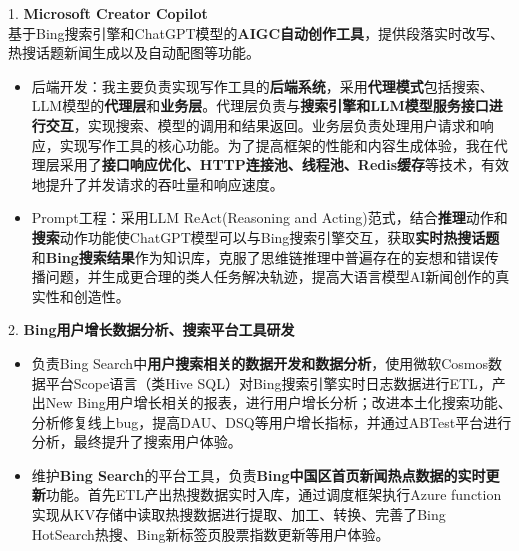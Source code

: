 \documentclass{resume}
\begin{document}

  1. \textbf{Microsoft Creator Copilot} 
  \\
  基于Bing搜索引擎和ChatGPT模型的\textbf{AIGC自动创作工具}，提供段落实时改写、热搜话题新闻生成以及自动配图等功能。
  \begin{spacing}{1.2} 
  \begin{itemize}
    \item 后端开发：我主要负责实现写作工具的\textbf{后端系统}，采用\textbf{代理模式}包括搜索、LLM模型的\textbf{代理层}和\textbf{业务层}。代理层负责与\textbf{搜索引擎和LLM模型服务接口进行交互}，实现搜索、模型的调用和结果返回。业务层负责处理用户请求和响应，实现写作工具的核心功能。为了提高框架的性能和内容生成体验，我在代理层采用了\textbf{接口响应优化、HTTP连接池、线程池、Redis缓存}等技术，有效地提升了并发请求的吞吐量和响应速度。
    \item Prompt工程：采用LLM ReAct(Reasoning and Acting)范式，结合\textbf{推理}动作和\textbf{搜索}动作功能使ChatGPT模型可以与Bing搜索引擎交互，获取\textbf{实时热搜话题}和\textbf{Bing搜索结果}作为知识库，克服了思维链推理中普遍存在的妄想和错误传播问题，并生成更合理的类人任务解决轨迹，提高大语言模型AI新闻创作的真实性和创造性。
  \end{itemize}
  2. \textbf{Bing用户增长数据分析、搜索平台工具研发}
  \begin{itemize}
    \item 负责Bing Search中\textbf{用户搜索相关的数据开发和数据分析}，使用微软Cosmos数据平台Scope语言（类Hive SQL）对Bing搜索引擎实时日志数据进行ETL，产出New Bing用户增长相关的报表，进行用户增长分析；改进本土化搜索功能、分析修复线上bug，提高DAU、DSQ等用户增长指标，并通过ABTest平台进行分析，最终提升了搜索用户体验。
    \item 维护\textbf{Bing Search}的平台工具，负责\textbf{Bing中国区首页新闻热点数据的实时更新}功能。首先ETL产出热搜数据实时入库，通过调度框架执行Azure function实现从KV存储中读取热搜数据进行提取、加工、转换、完善了Bing HotSearch热搜、Bing新标签页股票指数更新等用户体验。
  \end{itemize}
\end{spacing}
 
\end{document}
